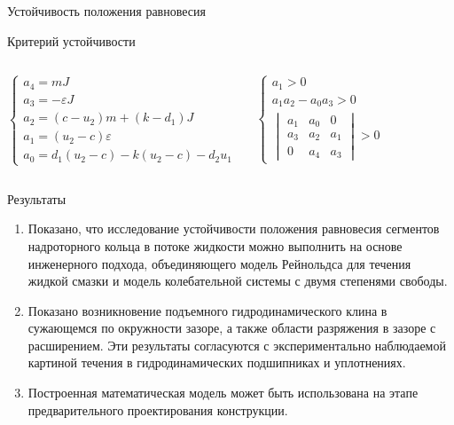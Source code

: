 \documentclass[ignoreonframetext,unicode]{beamer}
\begin{document}
\begin{frame}{Устойчивость положения равновесия}
\vspace*{-2mm}
\begin{block}{Критерий устойчивости}
	\vspace*{-2mm}
	\begin{columns}
		
	\begin{equation*} 
		\begin{cases}
			a_4 = m J \\
			a_3 = - \varepsilon J \\
			a_2 = \left(c - u_2 \right) m + \left(k - d_1 \right)J \\
			a_1 = \left(u_2 - c\right) \varepsilon \\
			a_0 = d_1 \left( u_2 - c \right) - k \left( u_2 - c \right) - d_2 u_1
		\end{cases}
	\end{equation*}

		\begin{equation*} 
		\begin{cases}
			a_1 >  0 \\
			a_1 a_2 - a_0 a_3 > 0 \\
			\begin{vmatrix*}
				a_1 & a_0 & 0 \\
				a_3 & a_2 & a_1 \\
				0 & a_4 & a_3 
			\end{vmatrix*} > 0
		\end{cases}
	\end{equation*}
\end{columns}
\end{block}


	
\end{frame}

\begin{frame}{Результаты}
	\begin{block}{}
	\begin{enumerate}	
		\item Показано, что исследование устойчивости положения равновесия сегментов надроторного кольца в потоке жидкости можно выполнить на основе инженерного подхода, объединяющего модель Рейнольдса для течения жидкой смазки и модель колебательной системы с двумя степенями свободы.
		\item Показано возникновение подъемного гидродинамического клина в сужающемся по окружности зазоре, а также области разряжения в зазоре с расширением. Эти результаты согласуются с экспериментально наблюдаемой картиной течения в гидродинамических подшипниках и уплотнениях.
		\item Построенная математическая модель может быть использована на этапе предварительного проектирования конструкции.
	\end{enumerate}
	\end{block}	

\end{frame}	
\end{document}

